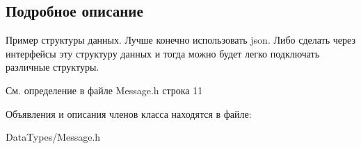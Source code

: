\subsection{Подробное описание}
Пример структуры данных. Лучше конечно использовать json. Либо сделать через интерфейсы эту структуру данных и тогда можно будет легко подключать различные структуры. 

См. определение в файле Message.\+h строка 11



Объявления и описания членов класса находятся в файле\+:\begin{DoxyCompactItemize}
\item 
Data\+Types/Message.\+h\end{DoxyCompactItemize}
